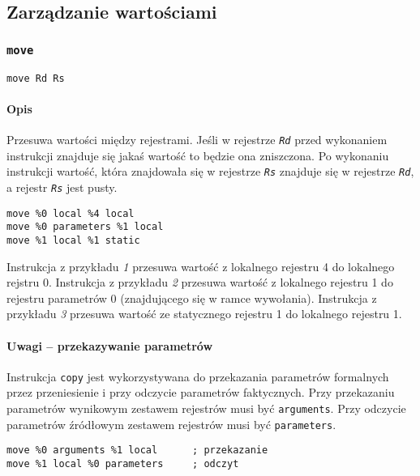 \subsection{Zarządzanie wartościami}
\label{viua_vm_ops_value_management}

\subsubsection{\texttt{move}}
\label{viua_vm_ops_value_management_move}

\begin{lstlisting}
move Rd Rs
\end{lstlisting}

\paragraph*{Opis} Przesuwa wartości między rejestrami. Jeśli w rejestrze
\texttt{\emph{Rd}} przed wykonaniem instrukcji znajduje się jakaś wartość to
będzie ona zniszczona. Po wykonaniu instrukcji wartość, która znajdowała się w
rejestrze \texttt{\emph{Rs}} znajduje się w rejestrze \texttt{\emph{Rd}}, a
rejestr \texttt{\emph{Rs}} jest pusty.

\begin{lstlisting}
move %0 local %4 local
move %0 parameters %1 local
move %1 local %1 static
\end{lstlisting}

Instrukcja z przykładu \emph{1} przesuwa wartość z lokalnego rejestru 4 do
lokalnego rejstru 0.
Instrukcja z przykładu \emph{2} przesuwa wartość z lokalnego rejestru 1 do
rejestru parametrów 0 (znajdującego się w ramce wywołania).
Instrukcja z przykładu \emph{3} przesuwa wartość ze statycznego rejestru 1 do
lokalnego rejestru 1.

\paragraph*{Uwagi -- przekazywanie parametrów} Instrukcja \texttt{copy} jest
wykorzystywana do przekazania parametrów formalnych przez przeniesienie i przy
odczycie parametrów faktycznych.
Przy przekazaniu parametrów wynikowym zestawem rejestrów musi być
\texttt{arguments}. Przy odczycie parametrów źródłowym zestawem rejestrów musi
być \texttt{parameters}.
\begin{lstlisting}
move %0 arguments %1 local      ; przekazanie
move %1 local %0 parameters     ; odczyt
\end{lstlisting}

